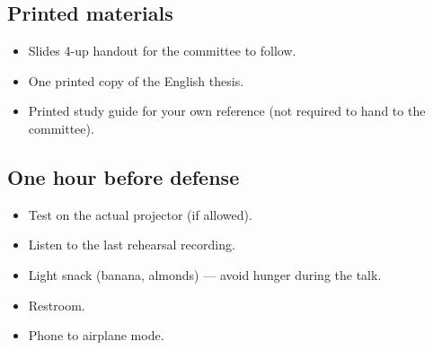 \documentclass[11pt,a4paper]{article}
\begin{document}
\subsection{Printed materials}
\begin{itemize}[leftmargin=*, itemsep=2pt]
  \item Slides 4-up handout for the committee to follow.
  \item One printed copy of the English thesis.
  \item Printed study guide for your own reference (not required to hand to the committee).
\end{itemize}

\subsection{One hour before defense}
\begin{itemize}[leftmargin=*, itemsep=2pt]
  \item Test on the actual projector (if allowed).
  \item Listen to the last rehearsal recording.
  \item Light snack (banana, almonds) --- avoid hunger during the talk.
  \item Restroom.
  \item Phone to airplane mode.
\end{itemize}
\end{document}

